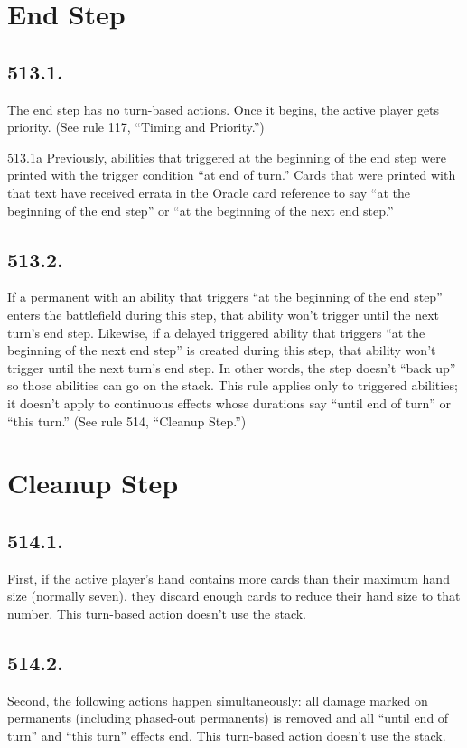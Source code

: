\section{End Step}
\subsection*{513.1.}
The end step has no turn-based actions. Once it begins, the active player gets priority. (See rule 117, “Timing and Priority.”)

513.1a Previously, abilities that triggered at the beginning of the end step were printed with the trigger condition “at end of turn.” Cards that were printed with that text have received errata in the Oracle card reference to say “at the beginning of the end step” or “at the beginning of the next end step.”

\subsection*{513.2.}
If a permanent with an ability that triggers “at the beginning of the end step” enters the battlefield during this step, that ability won’t trigger until the next turn’s end step. Likewise, if a delayed triggered ability that triggers “at the beginning of the next end step” is created during this step, that ability won’t trigger until the next turn’s end step. In other words, the step doesn’t “back up” so those abilities can go on the stack. This rule applies only to triggered abilities; it doesn’t apply to continuous effects whose durations say “until end of turn” or “this turn.” (See rule 514, “Cleanup Step.”)

\section{Cleanup Step}
\subsection*{514.1.}
First, if the active player’s hand contains more cards than their maximum hand size (normally seven), they discard enough cards to reduce their hand size to that number. This turn-based action doesn’t use the stack.

\subsection*{514.2.}
Second, the following actions happen simultaneously: all damage marked on permanents (including phased-out permanents) is removed and all “until end of turn” and “this turn” effects end. This turn-based action doesn’t use the stack.

